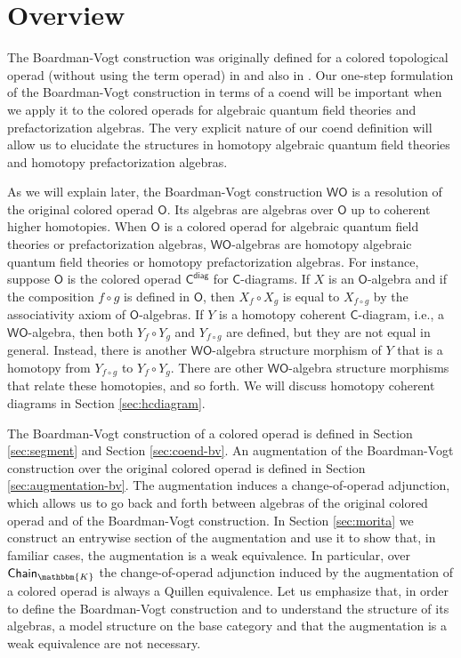 \documentclass{amsbook}
\numberwithin{section}{chapter}
\numberwithin{subsection}{section}
\numberwithin{equation}{section}
\theoremstyle{plain}
\theoremstyle{definition}
\newcommand{\fieldk}{\mathbbm{K}}
\newcommand{\C}{\mathsf{C}}
\renewcommand{\O}{\mathsf{O}}
\newcommand{\W}{\mathsf{W}}
\newcommand{\Cdiag}{\C^{\mathsf{diag}}}
\newcommand{\Chaink}{\mathsf{Chain}_{\fieldk}}
\newcommand{\wo}{\W\O}
\begin{document}
\section{Overview}
The Boardman-Vogt construction was originally defined for a colored topological operad (without using the term operad) in \cite{boardman-vogt} and also in \cite{vogt}.  Our one-step formulation of the Boardman-Vogt construction in terms of a coend will be important when we apply it to the colored operads for algebraic quantum field theories and prefactorization algebras.  The very explicit nature of our coend definition will allow us to elucidate the structures in homotopy algebraic quantum field theories and homotopy prefactorization algebras.

As we will explain later, the Boardman-Vogt construction $\wo$ is a resolution of the original colored operad $\O$.  Its algebras are algebras over $\O$ up to coherent higher homotopies.  When $\O$ is a colored operad for algebraic quantum field theories or prefactorization algebras, $\wo$-algebras are homotopy algebraic quantum field theories or homotopy prefactorization algebras.  For instance, suppose $\O$ is the colored operad $\Cdiag$ for $\C$-diagrams.  If $X$ is an $\O$-algebra and if the composition $f\circ g$ is defined in $\O$, then $X_f \circ X_g$ is equal to $X_{f\circ g}$ by the associativity axiom of $\O$-algebras.  If $Y$ is a homotopy coherent $\C$-diagram, i.e., a $\wo$-algebra, then both $Y_f \circ Y_g$ and $Y_{f\circ g}$ are defined, but they are not equal in general.  Instead, there is another $\wo$-algebra structure morphism of $Y$ that is a homotopy from $Y_{f\circ g}$ to $Y_f \circ Y_g$.  There are other $\wo$-algebra structure morphisms that relate these homotopies, and so forth.  We will discuss homotopy coherent diagrams in Section \ref{sec:hcdiagram}.

The Boardman-Vogt construction of a colored operad is defined in Section \ref{sec:segment} and Section \ref{sec:coend-bv}.  An augmentation of the Boardman-Vogt construction over the original colored operad is defined in Section \ref{sec:augmentation-bv}.  The augmentation induces a change-of-operad adjunction, which allows us to go back and forth between algebras of the original colored operad and of the Boardman-Vogt construction.  In Section \ref{sec:morita} we construct an entrywise section of the augmentation and use it to show that, in familiar cases, the augmentation is a weak equivalence.  In particular, over $\Chaink$ the change-of-operad adjunction induced by the augmentation of a colored operad is always a Quillen equivalence.  Let us emphasize that, in order to define the Boardman-Vogt construction and to understand the structure of its algebras, a model structure on the base category and that the augmentation is a weak equivalence are not necessary.
\end{document}
